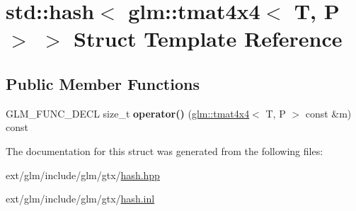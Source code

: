 \hypertarget{structstd_1_1hash_3_01glm_1_1tmat4x4_3_01_t_00_01_p_01_4_01_4}{\section{std\-:\-:hash$<$ glm\-:\-:tmat4x4$<$ T, P $>$ $>$ Struct Template Reference}
\label{structstd_1_1hash_3_01glm_1_1tmat4x4_3_01_t_00_01_p_01_4_01_4}
}
\subsection*{Public Member Functions}
\begin{DoxyCompactItemize}
\item 
\hypertarget{structstd_1_1hash_3_01glm_1_1tmat4x4_3_01_t_00_01_p_01_4_01_4_aa54232c330171a864e2466bf14d66391}{G\-L\-M\-\_\-\-F\-U\-N\-C\-\_\-\-D\-E\-C\-L size\-\_\-t {\bfseries operator()} (\hyperlink{structglm_1_1tmat4x4}{glm\-::tmat4x4}$<$ T, P $>$ const \&m) const }\label{structstd_1_1hash_3_01glm_1_1tmat4x4_3_01_t_00_01_p_01_4_01_4_aa54232c330171a864e2466bf14d66391}

\end{DoxyCompactItemize}


The documentation for this struct was generated from the following files\-:\begin{DoxyCompactItemize}
\item 
ext/glm/include/glm/gtx/\hyperlink{hash_8hpp}{hash.\-hpp}\item 
ext/glm/include/glm/gtx/\hyperlink{hash_8inl}{hash.\-inl}\end{DoxyCompactItemize}
